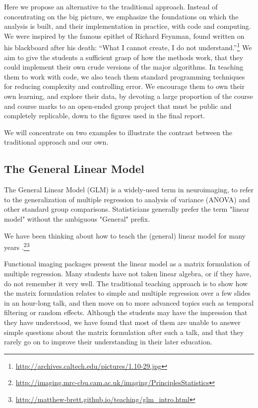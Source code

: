 Here we propose an alternative to the traditional approach.  Instead of
concentrating on the big picture, we emphasize the foundations on which the
analysis is built, and their implementation in practice, with code and
computing.  We were inspired by the famous epithet of Richard Feynman, found
written on his blackboard after his death: ``What I cannot create, I do not
understand.''\footnote{\url{http://archives.caltech.edu/pictures/1.10-29.jpg}}
We aim to give the students a sufficient grasp of how the methods work, that
they could implement their own crude versions of the major algorithms.  In
teaching them to work with code, we also teach them standard programming
techniques for reducing complexity and controlling error.  We encourage them
to own their own learning, and explore their data, by devoting a large
proportion of the course and course marks to an open-ended group project that
must be public and completely replicable, down to the figures used in the
final report.

We will concentrate on two examples to illustrate the contrast between the
traditional approach and our own.

\subsection{The General Linear Model}

The General Linear Model (GLM) is a widely-used term in neuroimaging, to refer
to the generalization of multiple regression to analysis of variance (ANOVA)
and other standard group comparisons.  Statisticians generally prefer the term
"linear model" without the ambiguous "General" prefix.

We have been thinking about how to teach the (general) linear model for many
years
\citep{poline2012general}.\footnote{\url{http://imaging.mrc-cbu.cam.ac.uk/imaging/PrinciplesStatistics}}\footnote{\label{glm_intro}
\url{http://matthew-brett.github.io/teaching/glm_intro.html}}

Functional imaging packages present the linear model as a matrix formulation
of multiple regression.  Many students have not taken linear algebra, or if
they have, do not remember it very well.  The traditional teaching approach is
to show how the matrix formulation relates to simple and multiple regression
over a few slides in an hour-long talk, and then move on to more advanced
topics such as temporal filtering or random effects.  Although the students
may have the impression that they have understood, we have found that most of
them are unable to answer simple questions about the matrix formulation after
such a talk, and that they rarely go on to improve their understanding in
their later education.

